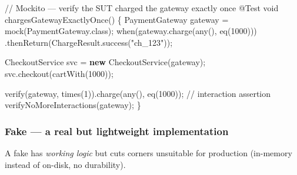 \documentclass[11pt]{article}
\newenvironment{Shaded}{\begin{snugshade}}{\end{snugshade}}
\newcommand{\AttributeTok}[1]{\textcolor[rgb]{0.16,0.50,0.73}{#1}}
\newcommand{\CommentTok}[1]{\textcolor[rgb]{0.48,0.49,0.49}{#1}}
\newcommand{\DataTypeTok}[1]{\textcolor[rgb]{0.16,0.50,0.73}{#1}}
\newcommand{\DecValTok}[1]{\textcolor[rgb]{0.96,0.45,0.00}{#1}}
\newcommand{\FunctionTok}[1]{\textcolor[rgb]{0.56,0.27,0.68}{#1}}
\newcommand{\KeywordTok}[1]{\textcolor[rgb]{0.81,0.81,0.76}{\textbf{#1}}}
\newcommand{\NormalTok}[1]{\textcolor[rgb]{0.81,0.81,0.76}{#1}}
\newcommand{\OperatorTok}[1]{\textcolor[rgb]{0.81,0.81,0.76}{#1}}
\newcommand{\StringTok}[1]{\textcolor[rgb]{0.96,0.31,0.31}{#1}}
\begin{document}
\begin{Shaded}
\begin{Highlighting}[]
\CommentTok{// Mockito — verify the SUT charged the gateway exactly once}
\AttributeTok{@Test}
\DataTypeTok{void} \FunctionTok{chargesGatewayExactlyOnce}\OperatorTok{()} \OperatorTok{\{}
\NormalTok{    PaymentGateway gateway }\OperatorTok{=} \FunctionTok{mock}\OperatorTok{(}\NormalTok{PaymentGateway}\OperatorTok{.}\FunctionTok{class}\OperatorTok{);}
    \FunctionTok{when}\OperatorTok{(}\NormalTok{gateway}\OperatorTok{.}\FunctionTok{charge}\OperatorTok{(}\FunctionTok{any}\OperatorTok{(),} \FunctionTok{eq}\OperatorTok{(}\DecValTok{1000}\OperatorTok{)))}
        \OperatorTok{.}\FunctionTok{thenReturn}\OperatorTok{(}\NormalTok{ChargeResult}\OperatorTok{.}\FunctionTok{success}\OperatorTok{(}\StringTok{"ch\_123"}\OperatorTok{));}

\NormalTok{    CheckoutService svc }\OperatorTok{=} \KeywordTok{new} \FunctionTok{CheckoutService}\OperatorTok{(}\NormalTok{gateway}\OperatorTok{);}
\NormalTok{    svc}\OperatorTok{.}\FunctionTok{checkout}\OperatorTok{(}\FunctionTok{cartWith}\OperatorTok{(}\DecValTok{1000}\OperatorTok{));}

    \FunctionTok{verify}\OperatorTok{(}\NormalTok{gateway}\OperatorTok{,} \FunctionTok{times}\OperatorTok{(}\DecValTok{1}\OperatorTok{)).}\FunctionTok{charge}\OperatorTok{(}\FunctionTok{any}\OperatorTok{(),} \FunctionTok{eq}\OperatorTok{(}\DecValTok{1000}\OperatorTok{));} \CommentTok{// interaction assertion}
    \FunctionTok{verifyNoMoreInteractions}\OperatorTok{(}\NormalTok{gateway}\OperatorTok{);}
\OperatorTok{\}}
\end{Highlighting}
\end{Shaded}

\subsubsection{Fake --- a real but lightweight implementation}\label{fake--a-real-but-lightweight-implementation}

A fake has \emph{working logic} but cuts corners unsuitable for production (in-memory instead of on-disk, no durability).

\end{document}
